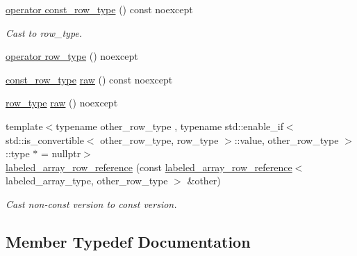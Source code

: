 \begin{DoxyCompactItemize}
\item 
\hyperlink{classIceBRG_1_1labeled__array__row__reference_a0e900a8b5986ca2cb340474a3f418f5d}{operator const\+\_\+row\+\_\+type} () const  noexcept
\begin{DoxyCompactList}\small\item\em Cast to row\+\_\+type. \end{DoxyCompactList}\item 
\hyperlink{classIceBRG_1_1labeled__array__row__reference_ab82d5549f91955afcd109b1cd3e993ed}{operator row\+\_\+type} () noexcept
\item 
\hyperlink{classIceBRG_1_1labeled__array__row__reference_a80b2a3ea3231a22bf8c493841ad8cf3a}{const\+\_\+row\+\_\+type} \hyperlink{classIceBRG_1_1labeled__array__row__reference_af46b03ffffb0b010f6e8e5363a7d67b9}{raw} () const  noexcept
\item 
\hyperlink{classIceBRG_1_1labeled__array__row__reference_a5b537072b2f12f7a4ea9484e2e26986d}{row\+\_\+type} \hyperlink{classIceBRG_1_1labeled__array__row__reference_a958f842412775c063fbc4b1c6a17d2fc}{raw} () noexcept
\item 
{\footnotesize template$<$typename other\+\_\+row\+\_\+type , typename std\+::enable\+\_\+if$<$ std\+::is\+\_\+convertible$<$ other\+\_\+row\+\_\+type, row\+\_\+type $>$\+::value, other\+\_\+row\+\_\+type $>$\+::type $\ast$  = nullptr$>$ }\\\hyperlink{classIceBRG_1_1labeled__array__row__reference_abac40a2fd198e90d70557a349453def9}{labeled\+\_\+array\+\_\+row\+\_\+reference} (const \hyperlink{classIceBRG_1_1labeled__array__row__reference}{labeled\+\_\+array\+\_\+row\+\_\+reference}$<$ labeled\+\_\+array\+\_\+type, other\+\_\+row\+\_\+type $>$ \&other)
\begin{DoxyCompactList}\small\item\em Cast non-\/const version to const version. \end{DoxyCompactList}\end{DoxyCompactItemize}


\subsection{Member Typedef Documentation}
\hypertarget{classIceBRG_1_1labeled__array__row__reference_a32426fe25a4b7f8659eb5fe2b58ecba2}{}
